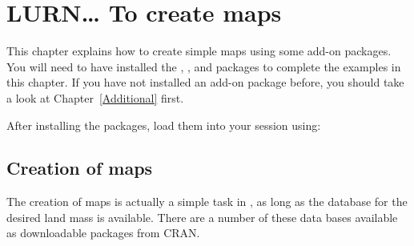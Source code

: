 

\chapter{LURN\ldots{} To create maps} 
\label{Maps} 
 

 
This chapter explains how to create simple maps using some add-on packages. You will need to have installed the , , and   packages to complete the examples in this chapter. If you have not installed an add-on package before, you should take a look at Chapter~\ref{Additional} first. 
 
After installing the packages, load them into your \R{} session using: 
\begin{knitrout}
\color{fgcolor}\begin{kframe}
\begin{alltt}
\hlstd{> }
\hlstd{> }
\hlstd{> }
\end{alltt}


{\ttfamily\noindent\itshape\color{messagecolor}{Loading required package: ggplot2}}\end{kframe}
\end{knitrout}
 
\section{Creation of maps} 
 
The creation of maps is actually a simple task in \R{}, as long as the database for the desired land mass is available. There are a number of these data bases available as downloadable packages from CRAN. 
 

